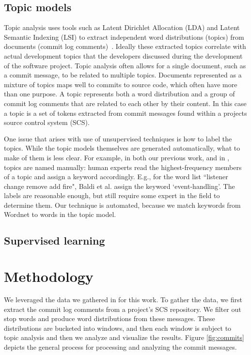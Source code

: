\documentclass[10pt, conference, compsocconf]{IEEEtran}
\begin{document}
\subsection{Topic models}
Topic analysis uses tools such as Latent Dirichlet Allocation (LDA) and Latent Semantic Indexing (LSI) to extract
independent word distributions (topics) from
documents (commit log comments)~\cite{marcus04wcre,Poshyvanyk2007,lukins08wcre,Linstead2007}.
Ideally these extracted topics 
correlate with actual development topics that the developers discussed
during the development of the software project. 
Topic analysis often allows for a single document, such as a commit
message, to be related to multiple topics. Documents represented as a mixture of topics maps well to commits
to source code, which often have more than one purpose.  A topic
represents both a word distribution and a group of commit log comments
that are related to each other by their content.  In this case a topic
is a set of tokens extracted from commit messages found within a
projects source control system (SCS).

One issue that arises with use of unsupervised techniques is how to label the topics. While the topic models themselves are generated automatically, what to make of them is less clear. For example, in both our previous work, and in \cite{Baldi2008}, topics are named manually: human experts read the highest-frequency members of a topic and assign a keyword accordingly. E.g., for the word list ``listener change remove add fire", Baldi et al. assign the keyword `event-handling'. The labels are reasonable enough, but still require some expert in the field to determine them. Our technique is automated, because we match keywords from Wordnet to words in the topic model. 

\subsection{Supervised learning}

\section{Methodology}
We leveraged the data we gathered in \cite{Hindle09ICSM} for this work. To gather the data, we first extract the commit log comments from a
project's SCS repository. We filter out stop words and produce word distributions from these messages. These distributions are bucketed
into windows, and then each window is subject to topic analysis and then we analyze and visualize the results. Figure \ref{fig:commits}
depicts the general process for processing and analyzing the commit
messages.
\end{document}
